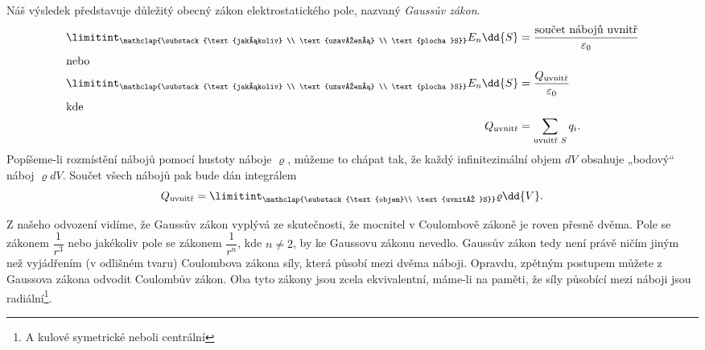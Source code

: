     Náš výsledek představuje důležitý obecný zákon elektrostatického pole, nazvaný \emph{Gaussův zákon}.
    \begin{align}
      \limitint_{\mathclap{\substack{\text{jakákoliv}      \\
                                     \text{uzavřená}       \\
                                     \text{plocha }S}}} E_n\dd{S} 
              &= \frac{\text{součet nábojů uvnitř}}{\varepsilon_0} \label{fyz:fey_eq_elstat34} \\
      \shortintertext{nebo}        
      \limitint_{\mathclap{\substack{\text{jakákoliv}       \\
                                            \text{uzavřená} \\
                                            \text{plocha }S}}} E_n\dd{S}
              &= \frac{Q_{\text{uvnitř}}}{\varepsilon_0}           \label{fyz:fey_eq_elstat35} \\
      \shortintertext{kde}
      Q_{\text{uvnitř}} 
              &= \sum\limits_{\text{uvnitř }S}q_i.                 \label{fyz:fey_eq_elstat36}  
    \end{align}
    Popíšeme-li rozmístění nábojů pomocí hustoty náboje \(\varrho\), můžeme to chápat tak, že každý 
    infinitezimální objem \(dV\) obsahuje „bodový“ náboj \(\varrho dV\). Součet všech nábojů pak 
    bude dán integrálem
    \begin{equation}\label{fyz:fey_eq_elstat37}
     Q_{\text{uvnitř}} = \limitint_{\mathclap{\substack{\text{objem}\\
                                                 \text{uvnitř }S}}} \varrho\dd{V}.
    \end{equation}
    
    Z našeho odvození vidíme, že Gaussův zákon vyplývá ze skutečnosti, že mocnitel v Coulombově 
    zákoně je roven přesně dvěma. Pole se zákonem \(\dfrac{1}{r^3}\) nebo jakékoliv pole se zákonem 
    \(\dfrac{1}{r^n}\), kde \(n\neq2\), by ke Gaussovu zákonu nevedlo. Gaussův zákon tedy není 
    právě ničím jiným než vyjádřením (v odlišném tvaru) Coulombova zákona síly, která působí mezi 
    dvěma náboji. Opravdu, zpětným postupem můžete z Gaussova zákona odvodit Coulombův zákon. Oba 
    tyto zákony jsou zcela ekvivalentní, máme-li na paměti, že síly působící mezi náboji jsou 
    radiální\footnote{A kulové symetrické neboli centrální}.
    
